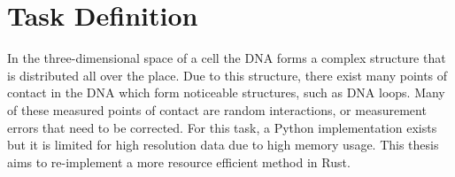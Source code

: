 %
%
%
%
%
%



\section{Task Definition}\label{sec:task}

In the three-dimensional space of a cell the DNA forms a complex structure that is
distributed all over the place. Due to this structure, there exist many points of contact
in the DNA which form noticeable structures, such as DNA loops. Many
of these measured points of contact are random interactions, or measurement errors that
need to be corrected. For this task, a Python implementation exists but it is
limited for high resolution data due to high memory usage. This thesis aims to
re-implement a more resource efficient method in Rust.

